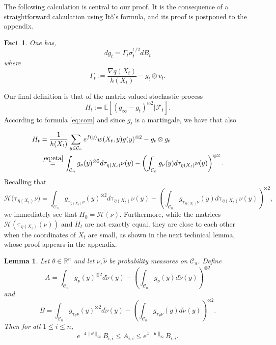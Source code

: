 \documentclass[12pt]{article}
\def \tilt{ \mathrm{\tau} }
\def \RR {\mathbb R}
\def \EE {\mathbb E}
\def \FF {\mathcal{F}}
\def \DC {\mathcal{C}_n}
\def \HH {\mathcal{H}}
\newtheorem{lemma}[theorem]{Lemma}
\newtheorem{fact}[theorem]{Fact}
\theoremstyle{definition}
\theoremstyle{remark}
\begin{document}
The following calculation is central to our proof. It is the consequence of a straightforward calculation using It\^{o}'s formula, and its proof is postponed to the appendix.
\begin{fact} \label{fact:dgt}
One has,
\begin{equation}\label{eq:dgt}
d g_t = \Gamma_t \sigma_t^{1/2} d B_t
\end{equation}
where
\begin{equation}\label{eq:defGammat}
\Gamma_t := \frac{\nabla q(X_t) }{ h(X_t)} - g_t \otimes v_t.
\end{equation}
\end{fact}
Our final definition is that of the matrix-valued stochastic process
\begin{equation}\label{eq:defHt}
H_t := \EE[ (g_\infty - g_t)^{\otimes 2} | \FF_t ].
\end{equation}
According to formula \eqref{eq:com} and since $g_t$ is a martingale, we have that also

	\begin{align*}
		H_t &= \frac{1}{h(X_t)} \sum_{y \in \DC} e^{f(y)} w(X_t,y) g(y)^{\otimes 2}  - g_t \otimes g_t \\
		& \stackrel{\eqref{eq:eta}}{=} \int_{\DC} g_{\nu}(y)^{\otimes 2} d \tilt_{\eta(X_t)} \nu(y)  - \left ( \int_{\DC} g_{\nu}(y) d \tilt_{\eta(X_t)} \nu(y) \right )^{\otimes 2}.
	\end{align*}
Recalling that
$$
\HH \bigl (\tilt_{\eta(X_t)} \nu \bigr) = \int_{\DC} g_{\tilt_{\eta(X_t)} \nu}(y)^{\otimes 2} d \tilt_{\eta(X_t)} \nu(y)  - \left ( \int_{\DC} g_{\tilt_{\eta(X_t)} \nu}(y) d \tilt_{\eta(X_t)} \nu(y) \right )^{\otimes 2},
$$
we immediately see that $H_0 = \HH(\nu)$. Furthermore, while the matrices $\HH(\tilt_{\eta(X_t)} (\nu))$ and $H_t$ are not exactly equal, they are close to each other when the coordinates of $X_t$ are small, as shown in the next technical lemma, whose proof appears in the appendix.

\begin{lemma} \label{lemHtHt}
Let $\theta \in \RR^n$ and let $\nu,\tilde \nu$ be probability measures on $\DC$. Define	
$$
A = \int_{\DC} g_{\nu}(y)^{\otimes 2} d \tilde \nu(y)  - \left ( \int_{\DC} g_{\nu}(y) d \tilde \nu(y) \right )^{\otimes 2}
$$	
and
$$
B = \int_{\DC} g_{\tilt_\theta \nu} (y)^{\otimes 2} d \tilde \nu(y)  - \left ( \int_{\DC} g_{\tilt_{\theta} \nu}(y) d \tilde \nu(y) \right )^{\otimes 2}.
$$
Then for all $1 \leq i \leq n$,
$$
e^{-4 \|\theta \|_\infty} B_{i,i} \leq A_{i,i} \leq e^{4 \|\theta \|_\infty} B_{i,i}.$$
\end{lemma}
\end{document}
